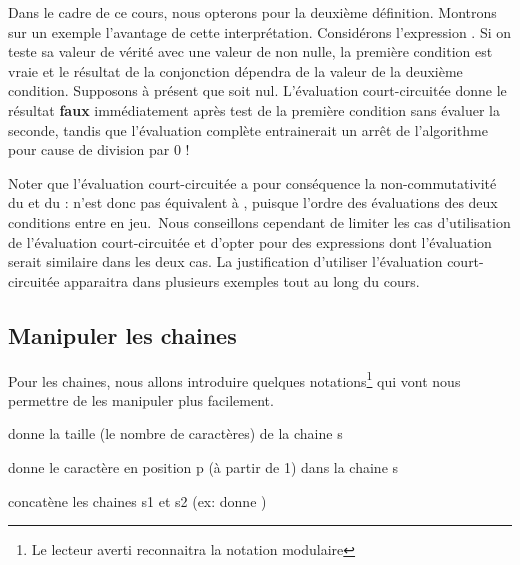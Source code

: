 			Dans le cadre de ce cours, nous opterons pour la deuxième définition.
			Montrons sur un exemple l’avantage de cette interprétation. Considérons
			l’expression 
			\textstyleCodeInsr{${\neq}$}. Si on teste sa valeur de vérité avec une
			valeur de  non nulle, la première condition est
			vraie et le résultat de la conjonction dépendra de la valeur de la
			deuxième condition. Supposons à présent que  soit
			nul. L’évaluation court-circuitée donne le résultat \textbf{faux}
			immédiatement après test de la première condition sans évaluer la
			seconde, tandis que l’évaluation complète entrainerait un arrêt de
			l’algorithme pour cause de division par 0 !
	
			Noter que l’évaluation court-circuitée a pour conséquence la
			non-commutativité du  et du
			:  n’est donc
			pas équivalent à , puisque l’ordre
			des évaluations des deux conditions entre en jeu.~Nous conseillons
			cependant de limiter les cas d’utilisation de l’évaluation
			court-circuitée et d'opter pour des expressions dont
			l’évaluation serait similaire dans les deux cas. La justification
			d’utiliser l’évaluation court-circuitée apparaitra dans plusieurs
			exemples tout au long du cours.
	
		\subsection{Manipuler les chaines}
		
			Pour les chaines, nous allons introduire quelques notations\footnote{
			Le lecteur averti reconnaitra la notation modulaire}
			qui vont nous permettre de les manipuler plus facilement.
		
			\begin{liste}
			\item {}
				donne la taille (le nombre de caractères) de la chaine s
			\item {}
				donne le caractère en position p (à partir de 1) dans la chaine s
			\item {}
				concatène les chaines s1 et s2 
				(ex:  donne )
			\end{liste}

